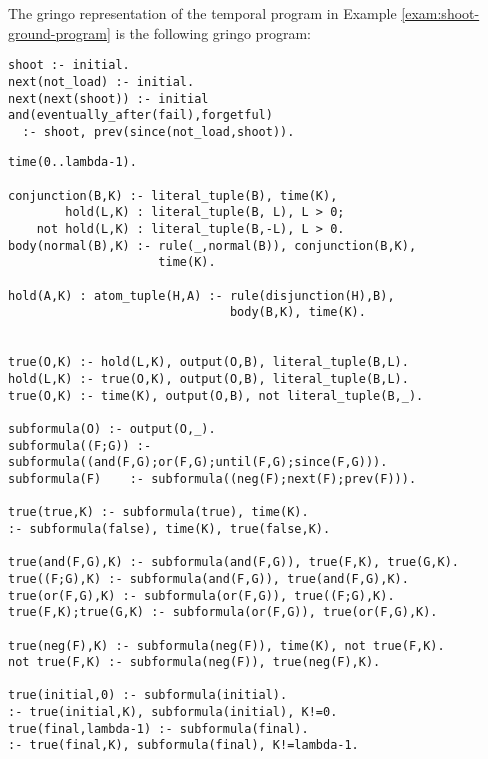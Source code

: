 \begin{example}\label{exam:shoot-ground-symbolic}
  The gringo representation of the temporal program in Example
  \ref{exam:shoot-ground-program} is the following gringo program:
\begin{center}
    \begin{lstlisting}[numbers=none]
shoot :- initial.
next(not_load) :- initial.
next(next(shoot)) :- initial
and(eventually_after(fail),forgetful) 
  :- shoot, prev(since(not_load,shoot)).
    \end{lstlisting}
\end{center}
\end{example}

\begin{center}
\begin{minipage}{\linewidth}
\begin{lstlisting}[language=clingo, label={lst:meta-telingo-one}]
time(0..lambda-1).

conjunction(B,K) :- literal_tuple(B), time(K),
        hold(L,K) : literal_tuple(B, L), L > 0;
    not hold(L,K) : literal_tuple(B,-L), L > 0.
body(normal(B),K) :- rule(_,normal(B)), conjunction(B,K), 
                     time(K).

hold(A,K) : atom_tuple(H,A) :- rule(disjunction(H),B), 
                               body(B,K), time(K).


true(O,K) :- hold(L,K), output(O,B), literal_tuple(B,L).
hold(L,K) :- true(O,K), output(O,B), literal_tuple(B,L).
true(O,K) :- time(K), output(O,B), not literal_tuple(B,_).

subformula(O) :- output(O,_).
subformula((F;G)) :- subformula((and(F,G);or(F,G);until(F,G);since(F,G))).
subformula(F)	 :- subformula((neg(F);next(F);prev(F))).

true(true,K) :- subformula(true), time(K).
:- subformula(false), time(K), true(false,K).

true(and(F,G),K) :- subformula(and(F,G)), true(F,K), true(G,K).
true((F;G),K) :- subformula(and(F,G)), true(and(F,G),K).
true(or(F,G),K) :- subformula(or(F,G)), true((F;G),K).
true(F,K);true(G,K) :- subformula(or(F,G)), true(or(F,G),K).

true(neg(F),K) :- subformula(neg(F)), time(K), not true(F,K).
not true(F,K) :- subformula(neg(F)), true(neg(F),K).

true(initial,0) :- subformula(initial).
:- true(initial,K), subformula(initial), K!=0.
true(final,lambda-1) :- subformula(final).
:- true(final,K), subformula(final), K!=lambda-1.


\end{lstlisting}
\end{minipage}
\end{center}
